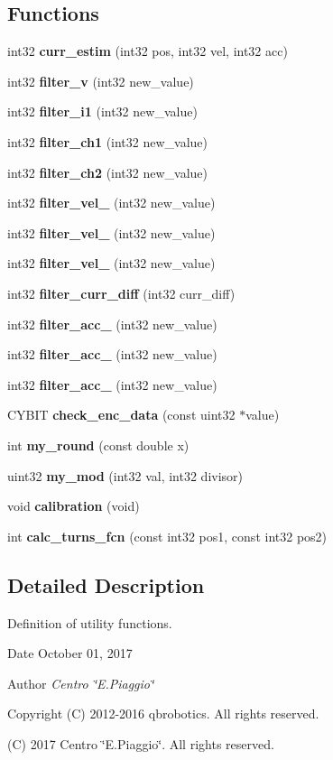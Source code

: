 \subsection*{Functions}
\begin{DoxyCompactItemize}
\item 
int32 \textbf{ curr\+\_\+estim} (int32 pos, int32 vel, int32 acc)
\item 
int32 \textbf{ filter\+\_\+v} (int32 new\+\_\+value)
\item 
int32 \textbf{ filter\+\_\+i1} (int32 new\+\_\+value)
\item 
int32 \textbf{ filter\+\_\+ch1} (int32 new\+\_\+value)
\item 
int32 \textbf{ filter\+\_\+ch2} (int32 new\+\_\+value)
\item 
int32 \textbf{ filter\+\_\+vel\+\_} (int32 new\+\_\+value)
\item 
int32 \textbf{ filter\+\_\+vel\+\_} (int32 new\+\_\+value)
\item 
int32 \textbf{ filter\+\_\+vel\+\_} (int32 new\+\_\+value)
\item 
int32 \textbf{ filter\+\_\+curr\+\_\+diff} (int32 curr\+\_\+diff)
\item 
int32 \textbf{ filter\+\_\+acc\+\_} (int32 new\+\_\+value)
\item 
int32 \textbf{ filter\+\_\+acc\+\_} (int32 new\+\_\+value)
\item 
int32 \textbf{ filter\+\_\+acc\+\_} (int32 new\+\_\+value)
\item 
C\+Y\+B\+IT \textbf{ check\+\_\+enc\+\_\+data} (const uint32 $\ast$value)
\item 
int \textbf{ my\+\_\+round} (const double x)
\item 
uint32 \textbf{ my\+\_\+mod} (int32 val, int32 divisor)
\item 
void \textbf{ calibration} (void)
\item 
int \textbf{ calc\+\_\+turns\+\_\+fcn} (const int32 pos1, const int32 pos2)
\end{DoxyCompactItemize}


\subsection{Detailed Description}
Definition of utility functions. 

\begin{DoxyDate}{Date}
October 01, 2017 
\end{DoxyDate}
\begin{DoxyAuthor}{Author}
{\itshape Centro \char`\"{}\+E.\+Piaggio\char`\"{}} 
\end{DoxyAuthor}
\begin{DoxyCopyright}{Copyright}
(C) 2012-\/2016 qbrobotics. All rights reserved. 

(C) 2017 Centro \char`\"{}\+E.\+Piaggio\char`\"{}. All rights reserved. 
\end{DoxyCopyright}



